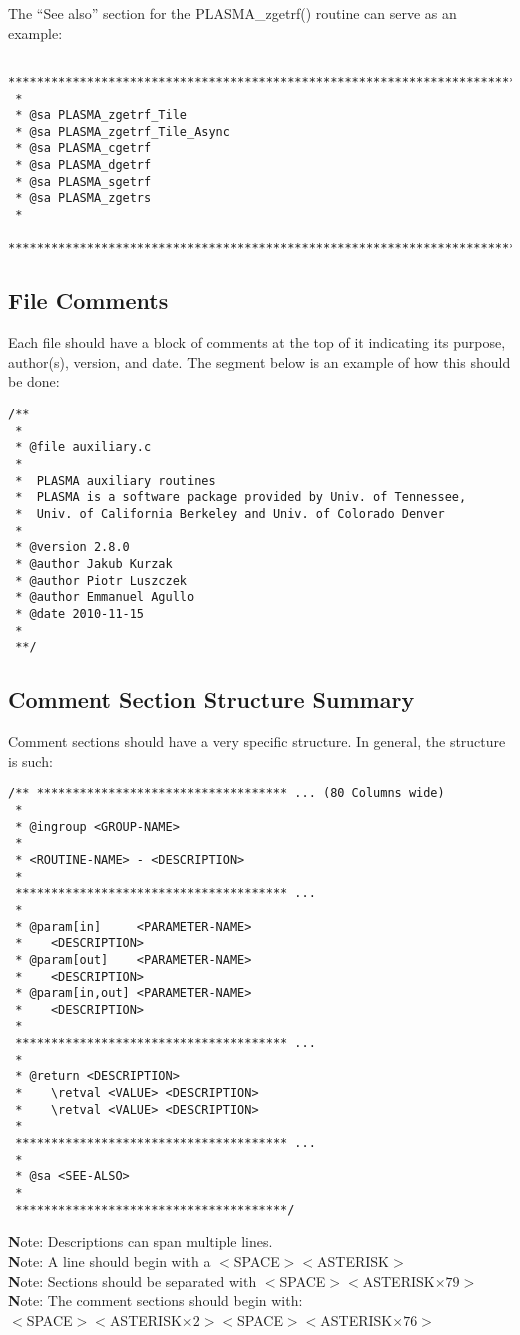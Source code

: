 The ``See also'' section for the PLASMA\_zgetrf() routine can serve as an example:
\begin{verbatim}
 *******************************************************************************
 *
 * @sa PLASMA_zgetrf_Tile
 * @sa PLASMA_zgetrf_Tile_Async
 * @sa PLASMA_cgetrf
 * @sa PLASMA_dgetrf
 * @sa PLASMA_sgetrf
 * @sa PLASMA_zgetrs
 *
 ******************************************************************************/
\end{verbatim}

\subsection{File Comments}
Each file should have a block of comments at the top of it indicating its purpose, author(s), version, and date.  The segment below is an example of how this should be done:
\begin{verbatim}
/**
 *
 * @file auxiliary.c
 *
 *  PLASMA auxiliary routines
 *  PLASMA is a software package provided by Univ. of Tennessee,
 *  Univ. of California Berkeley and Univ. of Colorado Denver
 *
 * @version 2.8.0
 * @author Jakub Kurzak
 * @author Piotr Luszczek
 * @author Emmanuel Agullo
 * @date 2010-11-15
 *
 **/
\end{verbatim}

\pagebreak
\subsection{Comment Section Structure Summary}
\label{comments:summary}
Comment sections should have a very specific structure. In general, the structure is such:
\begin{verbatim}
/** *********************************** ... (80 Columns wide)
 *
 * @ingroup <GROUP-NAME>
 *
 * <ROUTINE-NAME> - <DESCRIPTION>
 *
 ************************************** ...
 *
 * @param[in]     <PARAMETER-NAME>
 *    <DESCRIPTION>
 * @param[out]    <PARAMETER-NAME>
 *    <DESCRIPTION>
 * @param[in,out] <PARAMETER-NAME>
 *    <DESCRIPTION>
 *
 ************************************** ...
 *
 * @return <DESCRIPTION>
 *    \retval <VALUE> <DESCRIPTION>
 *    \retval <VALUE> <DESCRIPTION>     
 *
 ************************************** ...
 *
 * @sa <SEE-ALSO>
 *
 **************************************/
\end{verbatim}

{\textbf Note:} Descriptions can span multiple lines. \\
{\textbf Note:} A line should begin with a $<$SPACE$><$ASTERISK$>$ \\
{\textbf Note:} Sections should be separated with $<$SPACE$><$ASTERISK$\times 79>$ \\
{\textbf Note:} The comment sections should begin with: \\
$<$SPACE$><$ASTERISK$\times 2><$SPACE$><$ASTERISK$\times 76>$

